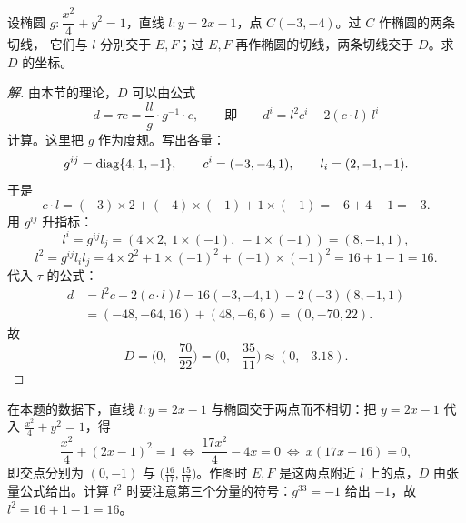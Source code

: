 \begin{example}
\label{ex:tau-compute}
设椭圆 $g:\dfrac{x^2}4+y^2=1$，直线 $l:y=2x-1$，点 $C(-3,-4)$。过 $C$ 作椭圆的两条切线，
它们与 $l$ 分别交于 $E,F$；过 $E,F$ 再作椭圆的切线，两条切线交于 $D$。求 $D$ 的坐标。
\end{example}

\begin{proof}[解]
由本节的理论，$D$ 可以由公式
\[
d=\tau c=\frac{ll}{g}\cdot g^{-1}\cdot c ,
\qquad\text{即}\qquad
d^i=l^2c^i-2(c\cdot l)\,l^i
\]
计算。这里把 $g$ 作为度规。写出各量：
\[
g^{ij}=\operatorname{diag}\{4,1,-1\},\qquad c^i=(-3,-4,1),\qquad l_i=(2,-1,-1).
\]
于是
\[
c\cdot l=(-3)\times2+(-4)\times(-1)+1\times(-1)=-6+4-1=-3 .
\]
用 $g^{ij}$ 升指标：
\[
l^i=g^{ij}l_j=(4\times2,\ 1\times(-1),\ -1\times(-1))=(8,-1,1),
\]
\[
l^2=g^{ij}l_il_j=4\times2^2+1\times(-1)^2+(-1)\times(-1)^2
=16+1-1=16 .
\]
代入 $\tau$ 的公式：
\begin{align*}
d&=l^2c-2(c\cdot l)l=16(-3,-4,1)-2(-3)(8,-1,1)\\
&=(-48,-64,16)+(48,-6,6)=(0,-70,22).
\end{align*}
故
\[
D=\Big(0,-\frac{70}{22}\Big)=\Big(0,-\frac{35}{11}\Big)\approx(0,-3.18).
\]
\end{proof}

\begin{remark}
在本题的数据下，直线 $l:y=2x-1$ 与椭圆交于两点而不相切：把 $y=2x-1$ 代入
$\frac{x^2}4+y^2=1$，得
\[
\frac{x^2}{4}+(2x-1)^2=1
\ \Longleftrightarrow\
\frac{17x^2}{4}-4x=0
\ \Longleftrightarrow\
x(17x-16)=0,
\]
即交点分别为 $(0,-1)$ 与 $\big(\frac{16}{17},\frac{15}{17}\big)$。作图时 $E,F$ 是这两点附近
$l$ 上的点，$D$ 由张量公式给出。计算 $l^2$ 时要注意第三个分量的符号：$g^{33}=-1$ 给出
$-1$，故 $l^2=16+1-1=16$。
\end{remark}
